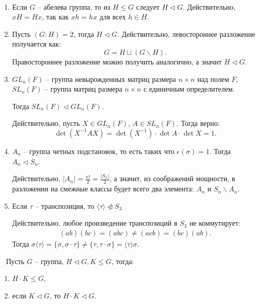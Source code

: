 \begin{example}~
    \begin{enumerate}
        \item Если $G$ -- абелева группа, то из $H \leq G $ следует $ H \vartriangleleft G$. Действительно,
        $xH = Hx$, так как $xh = hx$ для всех $h \in H$.
        \item Пусть $(G : H) = 2$, тогда $H \vartriangleleft G$. Действительно,
        левостороннее разложение получается как: $$G = H \sqcup (G \backslash H).$$ 
        Правостороннее разложение можно получить аналогично, а значит $H \vartriangleleft G$.
        \item 
        $GL_n(F)$ -- группа невырожденных матриц размера $n \times n$ над полем $F$, \\
        $SL_n(F)$ -- группа матриц размера $n \times n$ с единичным определителем.

        Тогда $SL_n(F) \vartriangleleft GL_n(F)$.

        Действительно, пусть $X \in GL_n(F)$, $A \in SL_n(F)$. Тогда верно: $$\det (X^{-1}AX) = \det (X^{-1}) \cdot \det A \cdot \det X = 1.$$
        \item $A_n$ -- группа четных подстановок, то есть таких что  $\epsilon(\sigma) = 1$. 
        Тогда $A_n \vartriangleleft S_n$.

        Действительно, $|A_n| = \frac{n!}{2} = \frac{|S_n|}{2}$, а значит, из соображений мощности,
        в разложении на смежные классы будет всего два элемента: $A_n$ и $S_n \backslash A_n$.
        \item Если $\tau$ -- транспозиция, то $\langle\tau\rangle \ntriangleleft S_3$ 
        
        Действительно, любое произведение транспозиций в $S_3$ не коммутирует: 
        \begin{gather*}
            (a b) (b c) = (a b c) \neq (a c b) = (b c) (a b).
        \end{gather*}
        Тогда $\sigma \langle \tau \rangle = \{\sigma, \sigma \cdot \tau\} \neq \{\tau, \tau \cdot \sigma\} = \langle\tau\rangle \sigma$.
    \end{enumerate}
\end{example}

\begin{theorem}~
    \label{th2.3}
    Пусть $G$ -- группа, $H \vartriangleleft G, K \leq G$, тогда:
    \begin{enumerate}
        \item $H \cdot K \leq G$,
        \item если $K \vartriangleleft G$, то $H \cdot K \vartriangleleft G$.
    \end{enumerate}
\end{theorem}

